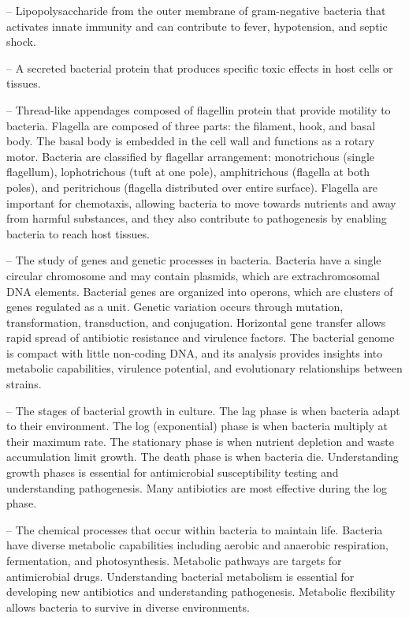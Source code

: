 -- Lipopolysaccharide from the outer membrane of gram-negative bacteria that activates innate immunity and can contribute to fever, hypotension, and septic shock.

-- A secreted bacterial protein that produces specific toxic effects in host cells or tissues.

-- Thread-like appendages composed of flagellin protein that provide motility to bacteria. Flagella are composed of three parts: the filament, hook, and basal body. The basal body is embedded in the cell wall and functions as a rotary motor. Bacteria are classified by flagellar arrangement: monotrichous (single flagellum), lophotrichous (tuft at one pole), amphitrichous (flagella at both poles), and peritrichous (flagella distributed over entire surface). Flagella are important for chemotaxis, allowing bacteria to move towards nutrients and away from harmful substances, and they also contribute to pathogenesis by enabling bacteria to reach host tissues.

-- The study of genes and genetic processes in bacteria. Bacteria have a single circular chromosome and may contain plasmids, which are extrachromosomal DNA elements. Bacterial genes are organized into operons, which are clusters of genes regulated as a unit. Genetic variation occurs through mutation, transformation, transduction, and conjugation. Horizontal gene transfer allows rapid spread of antibiotic resistance and virulence factors. The bacterial genome is compact with little non-coding DNA, and its analysis provides insights into metabolic capabilities, virulence potential, and evolutionary relationships between strains.

-- The stages of bacterial growth in culture. The lag phase is when bacteria adapt to their environment. The log (exponential) phase is when bacteria multiply at their maximum rate. The stationary phase is when nutrient depletion and waste accumulation limit growth. The death phase is when bacteria die. Understanding growth phases is essential for antimicrobial susceptibility testing and understanding pathogenesis. Many antibiotics are most effective during the log phase.

-- The chemical processes that occur within bacteria to maintain life. Bacteria have diverse metabolic capabilities including aerobic and anaerobic respiration, fermentation, and photosynthesis. Metabolic pathways are targets for antimicrobial drugs. Understanding bacterial metabolism is essential for developing new antibiotics and understanding pathogenesis. Metabolic flexibility allows bacteria to survive in diverse environments.

